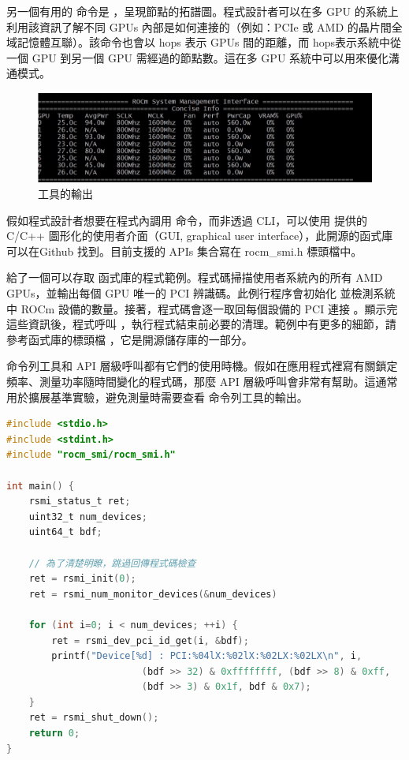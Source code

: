 另一個有用的  命令是 ，呈現節點的拓譜圖。程式設計者可以在多 GPU 的系統上利用該資訊了解不同 GPUs 內部是如何連接的（例如：PCIe 或 AMD 的晶片間全域記憶體互聯）。該命令也會以 hops 表示 GPUs 間的距離，而 hops表示系統中從一個 GPU 到另一個 GPU 需經過的節點數。這在多 GPU 系統中可以用來優化溝通模式。

\begin{figure}
    \centering
    \includegraphics[width=0.75\linewidth]{FileAusiliari/Screenshots/Figure7-4.png}
    \caption{工具的輸出}
    \label{fig:Output of the ROCm SMI tool}
\end{figure}

假如程式設計者想要在程式內調用  命令，而非透過 CLI，可以使用  提供的 C/C++ 圖形化的使用者介面（GUI, graphical user interface），此開源的函式庫可以在Github \cite{amd2021rocm-smi-lib} 找到。目前支援的 APIs 集合寫在 rocm\_smi.h 標頭檔中。

 給了一個可以存取  函式庫的程式範例。程式碼掃描使用者系統內的所有 AMD GPUs，並輸出每個 GPU 唯一的 PCI  辨識碼。此例行程序會初始化  並檢測系統中 ROCm 設備的數量。接著，程式碼會逐一取回每個設備的 PCI 連接 。顯示完這些資訊後，程式呼叫 ，執行程式結束前必要的清理。範例中有更多的細節，請參考函式庫的標頭檔 ，它是開源儲存庫\cite{amd2021rocm-smi-lib}的一部分。

命令列工具和 API 層級呼叫都有它們的使用時機。假如在應用程式裡寫有關鎖定頻率、測量功率隨時間變化的程式碼，那麼 API 層級呼叫會非常有幫助。這通常用於擴展基準實驗，避免測量時需要查看  命令列工具的輸出。

\begin{lstlisting}[language=C, caption={\term{ROCm-SMI-Lib}範例}, label={lst:ROCm-SMI-Lib}]
#include <stdio.h>
#include <stdint.h>
#include "rocm_smi/rocm_smi.h"

int main() {
    rsmi_status_t ret;
    uint32_t num_devices;
    uint64_t bdf;

    // 為了清楚明瞭，跳過回傳程式碼檢查
    ret = rsmi_init(0);
    ret = rsmi_num_monitor_devices(&num_devices)

    for (int i=0; i < num_devices; ++i) {
        ret = rsmi_dev_pci_id_get(i, &bdf);
        printf("Device[%d] : PCI:%04lX:%02lX:%02LX:%02LX\n", i,
                        (bdf >> 32) & 0xffffffff, (bdf >> 8) & 0xff,
                        (bdf >> 3) & 0x1f, bdf & 0x7);
    }
    ret = rsmi_shut_down();
    return 0;
}
\end{lstlisting}

